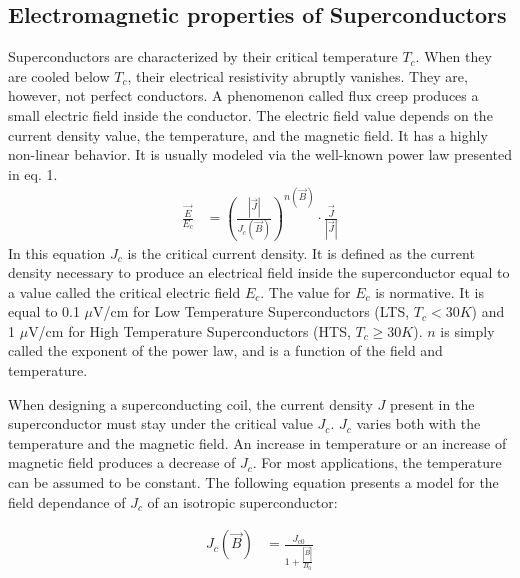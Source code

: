 \documentclass{ws-jmrr}
\begin{document}
\begin{multicols}{2}
\section{Electromagnetic properties of Superconductors}
\label{elec}
Superconductors are characterized by their critical temperature $T_c$. When they are cooled below $T_c$, their electrical resistivity abruptly vanishes. They are, however, not perfect conductors. A phenomenon called flux creep \cite{feigel1989theory} produces a small electric field inside the conductor. The electric field value depends on the current density value, the temperature, and the magnetic field. It has a highly non-linear behavior. It is usually modeled via the well-known power law \cite{ONOGI1989991} presented in eq. 1.
\begin{align}
\frac{\vec{E}}{E_c}&=\left (\frac{|\vec{J}|}{J_c(\vec{B})}  \right )^{n(\vec{B})}\cdot \frac{\vec{J}}{|\vec{J}|}
\label{powerlaw}
\end{align}
In this equation $J_ c$ is the critical current density. It is defined as the current density necessary to produce an electrical field inside the superconductor equal to a value called the critical electric field $E_c$. The value for $E_c$ is normative. It is equal to 0.1 $\mu$V/cm for Low Temperature Superconductors (LTS, $T_c<30K$) and 1 $\mu$V/cm for High Temperature Superconductors (HTS, $T_c \geq 30K$). $n$ is simply called the exponent of the power law, and is a function of the field and temperature.\par
When designing a superconducting coil, the current density $J$ present in the superconductor must stay under the critical value $J_c$. $J_c$ varies both with the temperature and the magnetic field. An increase in temperature or an increase of magnetic field produces a decrease of $J_c$. For most applications, the temperature can be assumed to be constant. The following equation presents a model for the field dependance of $J_c$ of an isotropic superconductor: 

\begin{align}
J_c(\vec{B})&=\frac{J_{\textrm{c0}}}{1+\frac{|\vec{B}|}{B_0}}
\label{model1}
\end{align}


\end{multicols}
\end{document}
